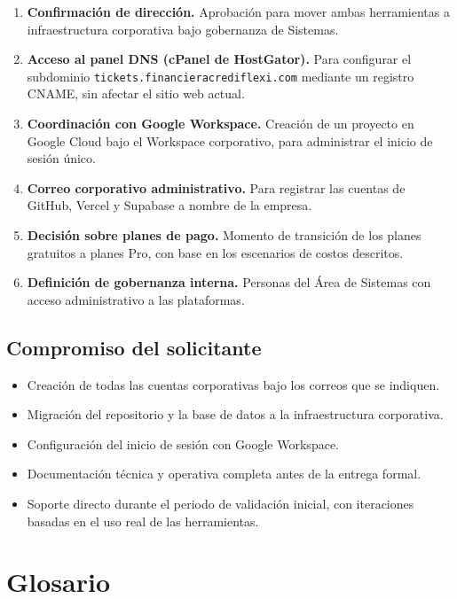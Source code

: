 \documentclass[12pt,a4paper]{article}
\begin{document}
\begin{enumerate}
  \item \textbf{Confirmación de dirección.}
        Aprobación para mover ambas herramientas
        a infraestructura corporativa bajo gobernanza de Sistemas.
  \item \textbf{Acceso al panel DNS (cPanel de HostGator).}
        Para configurar el subdominio
        \texttt{tickets.financieracrediflexi.com}
        mediante un registro CNAME, sin afectar el sitio web actual.
  \item \textbf{Coordinación con Google Workspace.}
        Creación de un proyecto en Google Cloud bajo el Workspace corporativo,
        para administrar el inicio de sesión único.
  \item \textbf{Correo corporativo administrativo.}
        Para registrar las cuentas de GitHub, Vercel y Supabase
        a nombre de la empresa.
  \item \textbf{Decisión sobre planes de pago.}
        Momento de transición de los planes gratuitos a planes Pro,
        con base en los escenarios de costos descritos.
  \item \textbf{Definición de gobernanza interna.}
        Personas del Área de Sistemas con acceso administrativo
        a las plataformas.
\end{enumerate}

\subsection*{Compromiso del solicitante}

\begin{itemize}
  \item Creación de todas las cuentas corporativas bajo los correos que se indiquen.
  \item Migración del repositorio y la base de datos a la infraestructura corporativa.
  \item Configuración del inicio de sesión con Google Workspace.
  \item Documentación técnica y operativa completa antes de la entrega formal.
  \item Soporte directo durante el periodo de validación inicial,
        con iteraciones basadas en el uso real de las herramientas.
\end{itemize}

\section*{Glosario}
\end{document}
